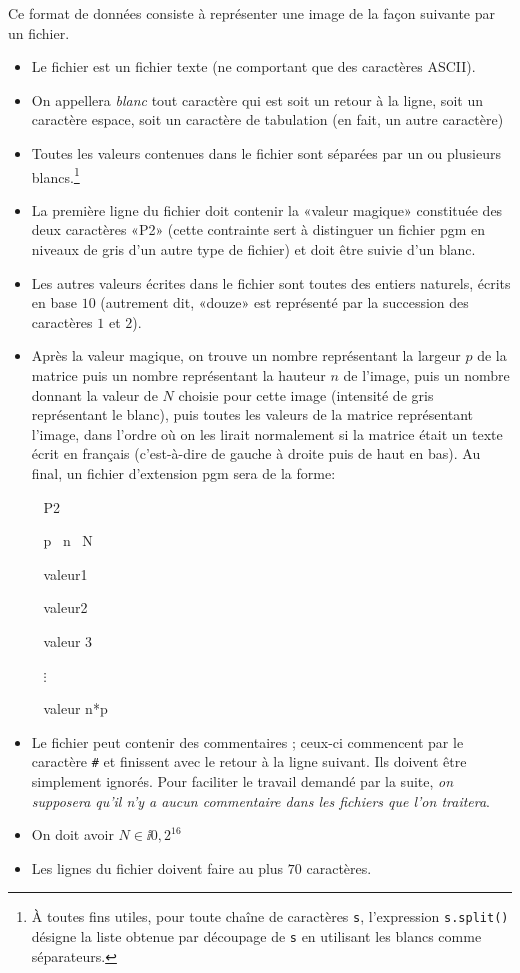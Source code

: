 Ce format de données consiste à représenter une image de la façon
suivante par un fichier.
\begin{itemize}
	\item[\textbullet] Le fichier est un fichier texte (ne comportant que des
	caractères ASCII).
	\item[\textbullet] On appellera \emph{blanc} tout caractère qui est soit un retour à la
	ligne, soit un caractère espace, soit un caractère de tabulation (en
	fait, un autre caractère)
	\item[\textbullet] Toutes les valeurs contenues dans le fichier sont séparées par
	un ou plusieurs blancs.\footnote{À toutes fins utiles, pour toute
		chaîne de caractères \texttt{s}, l'expression \texttt{s.split()} désigne
		la liste obtenue par découpage de \texttt{s} en utilisant les blancs
		comme séparateurs.}
	\item[\textbullet] La première ligne du fichier doit contenir la «valeur magique»
	constituée des deux caractères «P2» (cette contrainte sert à
	distinguer un fichier pgm en niveaux de gris d'un autre type de fichier) et doit être
	suivie d'un blanc.
	\item[\textbullet] Les autres valeurs écrites dans le fichier sont toutes des
	entiers naturels, écrits en base $10$ (autrement
	dit, «douze» est représenté par la succession des caractères $1$ et $2$).
	\item[\textbullet] Après  la valeur  magique, on trouve  un nombre  représentant la
	largeur $p$ de la matrice puis un nombre représentant la hauteur $n$
	de l'image,  puis un  nombre donnant la  valeur de $N$  choisie pour
	cette image  (intensité de gris représentant le  blanc), puis toutes
	les valeurs de  la matrice représentant l'image, dans  l'ordre où on
	les  lirait  normalement si  la  matrice  était  un texte  écrit  en
	français (c'est-à-dire de gauche à droite puis de haut en bas).
	\medskip Au final, un fichier d'extension pgm sera de la forme:
			
			\ \hskip5cm P2	
			
			\ \hskip5cm p \ n \ N 	
			
			\ \hskip5cm valeur1 
			
			\ \hskip5cm valeur2
			
			\ \hskip5cm valeur 3
			
			\ \hskip5.5cm $\vdots$
			
			\ \hskip5cm valeur n*p
	
\medskip 	
	\item[\textbullet] Le fichier peut contenir des commentaires ; ceux-ci commencent par le
	caractère \texttt{\#} et finissent avec le retour à la ligne
	suivant. Ils doivent être simplement ignorés. Pour faciliter le
	travail demandé par la suite, \emph{on supposera qu'il n'y a aucun
		commentaire dans les fichiers que l'on
		traitera}.
	\item[\textbullet] On doit avoir $N\in\ii{0, 2^{16}}$
	\item[\textbullet] Les lignes du fichier doivent faire au plus $70$ caractères.
\end{itemize}

